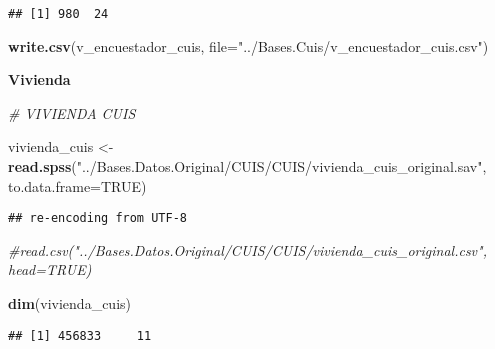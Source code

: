 \documentclass[11pt,]{article}
\newenvironment{Shaded}{\begin{snugshade}}{\end{snugshade}}
\newcommand{\KeywordTok}[1]{\textcolor[rgb]{0.13,0.29,0.53}{\textbf{#1}}}
\newcommand{\DataTypeTok}[1]{\textcolor[rgb]{0.13,0.29,0.53}{#1}}
\newcommand{\DecValTok}[1]{\textcolor[rgb]{0.00,0.00,0.81}{#1}}
\newcommand{\StringTok}[1]{\textcolor[rgb]{0.31,0.60,0.02}{#1}}
\newcommand{\CommentTok}[1]{\textcolor[rgb]{0.56,0.35,0.01}{\textit{#1}}}
\newcommand{\OtherTok}[1]{\textcolor[rgb]{0.56,0.35,0.01}{#1}}
\newcommand{\OperatorTok}[1]{\textcolor[rgb]{0.81,0.36,0.00}{\textbf{#1}}}
\newcommand{\NormalTok}[1]{#1}
\begin{document}
\begin{verbatim}
## [1] 980  24
\end{verbatim}

\begin{Shaded}
\begin{Highlighting}[]
\KeywordTok{write.csv}\NormalTok{(v_encuestador_cuis, }\DataTypeTok{file=}\StringTok{"../Bases.Cuis/v_encuestador_cuis.csv"}\NormalTok{)}
\end{Highlighting}
\end{Shaded}

\textbf{Vivienda}

\begin{Shaded}
\begin{Highlighting}[]
\CommentTok{# VIVIENDA CUIS}

\NormalTok{vivienda_cuis <-}\StringTok{ }\KeywordTok{read.spss}\NormalTok{(}\StringTok{"../Bases.Datos.Original/CUIS/CUIS/vivienda_cuis_original.sav"}\NormalTok{, }\DataTypeTok{to.data.frame=}\OtherTok{TRUE}\NormalTok{)}
\end{Highlighting}
\end{Shaded}

\begin{verbatim}
## re-encoding from UTF-8
\end{verbatim}

\begin{Shaded}
\begin{Highlighting}[]
                \CommentTok{#read.csv("../Bases.Datos.Original/CUIS/CUIS/vivienda_cuis_original.csv", head=TRUE)}

\KeywordTok{dim}\NormalTok{(vivienda_cuis)}
\end{Highlighting}
\end{Shaded}

\begin{verbatim}
## [1] 456833     11
\end{verbatim}

\begin{Shaded}
\end{Shaded}
\end{document}
